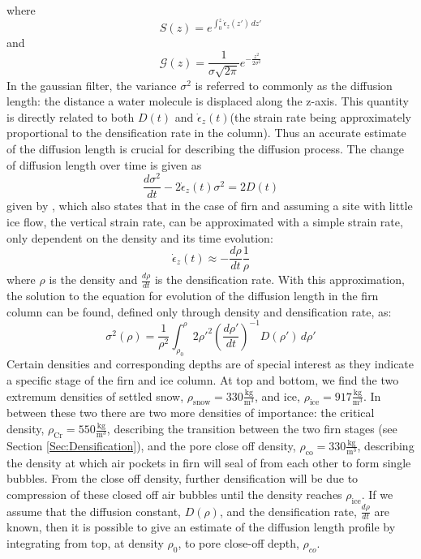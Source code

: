 \documentclass[../../CompleteThesis/Complete_1stDraft.tex]{subfiles}
\begin{document}
where
\begin{equation}
	S(z) = e^{\int_{0}^{z}\dot{\epsilon}_z(z')\, dz'}
	\label{Eq:Thinning_fct}
\end{equation}
and
\begin{equation}
	\mathcal{G}(z) = \frac{1}{\sigma\sqrt{2\pi}}e^{-\frac{z^2}{2\sigma^2}}
	\label{Eq:Gauss_filter}
\end{equation}
In the gaussian filter, the variance $\sigma^2$ is referred to commonly as the diffusion length: the distance a water molecule is displaced along the z-axis. This quantity is directly related to both $D(t)$ and $\dot{\epsilon}_z(t)$(the strain rate being approximately proportional to the densification rate in the column). Thus an accurate estimate of the diffusion length is crucial for describing the diffusion process.
The change of diffusion length over time is given as 
\begin{equation}
	\frac{d\sigma^2}{dt} - 2\dot{\epsilon}_z (t)\sigma^2 = 2 D(t)
	\label{Eq:Evolution_DiffLen}
\end{equation}
given by \cite[Johnsen, 1977]{Johnsen1977}, which also states that in the case of firn and assuming a site with little ice flow, the vertical strain rate, can be approximated with a simple strain rate, only dependent on the density and its time evolution:
\begin{equation}
	\dot{\epsilon}_z(t) \approx - \frac{d\rho}{dt}\frac{1}{\rho}
	\label{Eq:strain_rate_approx}
\end{equation}
where $\rho$ is the density and $\frac{d\rho}{dt}$ is the densification rate. With this approximation, the solution to the equation for evolution of the diffusion length in the firn column can be found, defined only through density and densification rate, as:
\begin{equation}
	\sigma^2(\rho) =\frac{1}{\rho^2} \int_{\rho_0}^{\rho}2\rho'^2\left(\frac{d\rho'}{dt}\right)^{-1} D(\rho') \, d\rho'
	\label{Eq:Diff_Len_Firn}
\end{equation}
Certain densities and corresponding depths are of special interest as they indicate a specific stage of the firn and ice column. At top and bottom, we find the two extremum densities of settled snow, $\rho_{\text{snow}} = 330 \frac{\text{kg}}{\text{m}^3}$, and ice, $\rho_{\text{ice}} = 917 \frac{\text{kg}}{\text{m}^3}$. In between these two there are two more densities of importance: the critical density, $\rho_{\text{Cr}} = 550 \frac{\text{kg}}{\text{m}^3}$, describing the transition between the two firn stages (see Section \ref{Sec:Densification}), and the pore close off density, $\rho_{\text{co}} = 330 \frac{\text{kg}}{\text{m}^3}$, describing the density at which air pockets in firn will seal of from each other to form single bubbles. From the close off density, further densification will be due to compression of these closed off air bubbles until the density reaches $\rho_{\text{ice}}$.
If we assume that the diffusion constant, $D(\rho)$, and the densification rate, $\frac{d\rho}{dt}$ are known, then it is possible to give an estimate of the diffusion length profile by integrating from top, at density $\rho_0$, to pore close-off depth, $\rho_{co}$.
\end{document}
